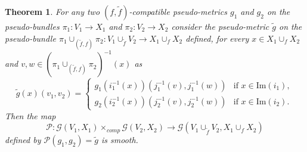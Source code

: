 \documentclass{article}
\newtheorem{thm}[lemma]{Theorem}
\begin{document}
\begin{thm}
For any two $(f,\tilde{f})$-compatible pseudo-metrics $g_1$ and $g_2$ on the pseudo-bundles $\pi_1:V_1\to X_1$ and $\pi_2:V_2\to X_2$ consider the pseudo-metric $\tilde{g}$ on the pseudo-bundle
$\pi_1\cup_{(\tilde{f},f)}\pi_2:V_1\cup_{\tilde{f}}V_2\to X_1\cup_f X_2$ defined, for every $x\in X_1\cup_f X_2$ and $v,w\in(\pi_1\cup_{(\tilde{f},f)}\pi_2)^{-1}(x)$ as
$$\tilde{g}(x)(v_1,v_2)=\left\{\begin{array}{ll} g_1(i_1^{-1}(x))(j_1^{-1}(v),j_1^{-1}(w)) & \mbox{if }x\in\mbox{Im}(i_1),\\
g_2(i_2^{-1}(x))(j_2^{-1}(v),j_2^{-1}(w)) & \mbox{if }x\in\mbox{Im}(i_2). \end{array}\right.$$ Then the map
$$\mathcal{P}:\mathcal{G}(V_1,X_1)\times_{comp}\mathcal{G}(V_2,X_2)\to\mathcal{G}(V_1\cup_{\tilde{f}}V_2,X_1\cup_f X_2)$$ defined by $\mathcal{P}(g_1,g_2)=\tilde{g}$ is smooth.
\end{thm}
\end{document}
